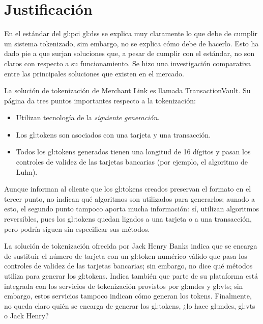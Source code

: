 \section{Justificación}


En el estándar del \gls{gl:pci} \gls{gl:dss} se explica muy claramente lo que debe de cumplir un
sistema tokenizado, sim embargo, no se explica cómo debe de hacerlo. Esto ha
dado pie a que surjan soluciones que, a pesar de cumplir con el estándar, no
son claros con respecto a su funcionamiento. Se hizo una investigación
comparativa entre las principales soluciones que existen en el mercado.


La solución de tokenización de Merchant Link es llamada TransactionVault. Su
página da tres puntos importantes respecto a la tokenización:
\begin{itemize}
  \item Utilizan tecnología de la \textit{siguiente generación}.
  \item Los \glspl{gl:token} son asociados con una tarjeta y una transacción.
  \item Todos los \glspl{gl:token} generados tienen una longitud de 16 dígitos y
    pasan los controles de validez de las tarjetas bancarias (por ejemplo, el
    algoritmo de Luhn).
\end{itemize}

Aunque informan al cliente que los \glspl{gl:token} creados preservan el
formato en el tercer punto, no indican qué algoritmos son utilizados para
generarlos; aunado a esto, el segundo punto tampoco aporta mucha información:
sí, utilizan algoritmos reversibles, pues los \glspl{gl:token} quedan ligados a
una tarjeta o a una transacción, pero podría siguen sin especificar sus métodos.



La solución de tokenización ofrecida por Jack Henry Banks indica que se
encarga de sustituir el número de tarjeta con un \gls{gl:token} numérico
válido que pasa los controles de validez  de las tarjetas bancarias; sin
embargo, no dice qué métodos utiliza para generar los \glspl{gl:token}. Indica
también que parte de su plataforma está integrada con los servicios de
tokenización provistos por \gls{gl:mdes} y \gls{gl:vts}; sin embargo, estos
servicios tampoco indican cómo generan los tokens. Finalmente, no queda claro
quién se encarga de generar los \glspl{gl:token}, ¿lo hace \gls{gl:mdes},
\gls{gl:vts} o Jack Henry?

